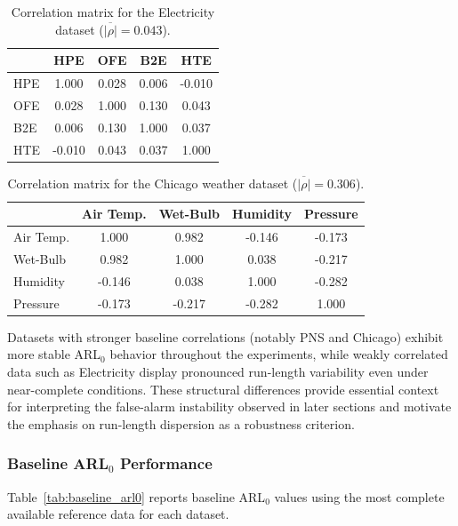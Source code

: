 \begin{table}[H]
\centering
\caption{Correlation matrix for the Electricity dataset ($\overline{|\rho|}=0.043$).}
\label{tab:corr_electricity}
\begin{tabular}{lcccc}
\toprule
 & HPE & OFE & B2E & HTE \\
\midrule
HPE & 1.000 & 0.028 & 0.006 & -0.010 \\
OFE & 0.028 & 1.000 & 0.130 & 0.043 \\
B2E & 0.006 & 0.130 & 1.000 & 0.037 \\
HTE & -0.010 & 0.043 & 0.037 & 1.000 \\
\bottomrule
\end{tabular}
\end{table}

\begin{table}[H]
\centering
\caption{Correlation matrix for the Chicago weather dataset ($\overline{|\rho|}=0.306$).}
\label{tab:corr_chicago}
\begin{tabular}{lcccc}
\toprule
 & Air Temp. & Wet-Bulb & Humidity & Pressure \\
\midrule
Air Temp.   & 1.000 & 0.982 & -0.146 & -0.173 \\
Wet-Bulb   & 0.982 & 1.000 & 0.038  & -0.217 \\
Humidity   & -0.146 & 0.038 & 1.000 & -0.282 \\
Pressure   & -0.173 & -0.217 & -0.282 & 1.000 \\
\bottomrule
\end{tabular}
\end{table}


Datasets with stronger baseline correlations (notably PNS and Chicago) exhibit more stable \ac{ARL}$_0$ behavior throughout the experiments, while weakly correlated data such as Electricity display pronounced run-length variability even under near-complete conditions. These structural differences provide essential context for interpreting the false-alarm instability observed in later sections and motivate the emphasis on run-length dispersion as a robustness criterion.

\subsubsection{Baseline \ac{ARL}$_0$ Performance}

Table~\ref{tab:baseline_arl0} reports baseline \ac{ARL}$_0$ values using the most complete available reference data for each dataset.

